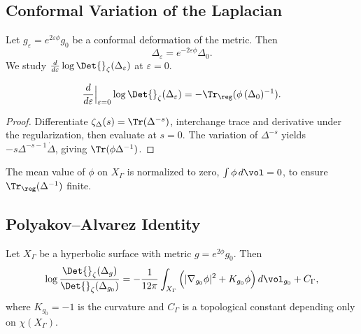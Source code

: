 \subsection{Conformal Variation of the Laplacian}\relax\hspace{0pt}
\label{subsec:conformal-variation}\relax\hspace{0pt}

Let $g_\varepsilon=e^{2\varepsilon\phi}g_0$ be a conformal deformation of the metric. Then
\[
\Delta_\varepsilon = e^{-2\varepsilon\phi}\Delta_0.
\]
We study $\frac{d}{d\varepsilon}\log\Det{}_\zeta(\Delta_\varepsilon)$ at $\varepsilon=0$. %

\begin{lemma}\label{lem:first-var}\relax
\[
\frac{d}{d\varepsilon}\Big|_{\varepsilon=0}\log\Det{}_\zeta(\Delta_\varepsilon)
=-\Tr_\reg(\phi\,(\Delta_0)^{-1}).
\]
\end{lemma}

\begin{proof}\relax
Differentiate $\zeta_\Delta(s)=\Tr(\Delta^{-s})$, interchange trace and derivative under the regularization, then evaluate at $s=0$. The variation of $\Delta^{-s}$ yields $-s\Delta^{-s-1}\dot\Delta$, giving $\Tr(\phi\Delta^{-1})$. %
\end{proof}

\begin{remark}\label{rem:gauge-norm}\relax
The mean value of $\phi$ on $X_\Gamma$ is normalized to zero, $\int\phi\,d\vol=0$, to ensure $\Tr_\reg(\Delta^{-1})$ finite. %
\end{remark}

\subsection{Polyakov–Alvarez Identity}\relax\hspace{0pt}
\label{subsec:polyakov}\relax\hspace{0pt}

\begin{theorem}\label{thm:PA}\relax
Let $X_\Gamma$ be a hyperbolic surface with metric $g=e^{2\phi}g_0$. Then
\[
\log\frac{\Det{}_\zeta(\Delta_g)}{\Det{}_\zeta(\Delta_{g_0})}
=-\frac{1}{12\pi}\int_{X_\Gamma}\Big(|\nabla_{g_0}\phi|^2 + K_{g_0}\phi\Big)\,d\vol_{g_0}
+ C_\Gamma,
\]
where $K_{g_0}=-1$ is the curvature and $C_\Gamma$ is a topological constant depending only on $\chi(X_\Gamma)$. %
\end{theorem}

